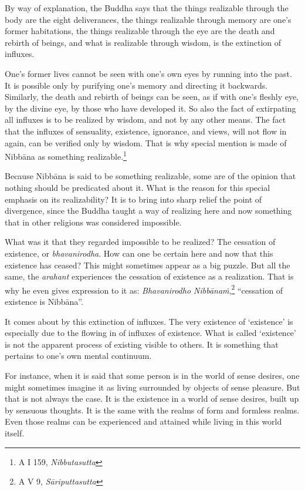 By way of explanation, the Buddha says that the things realizable through the body are the eight deliverances, the things realizable through memory are one's former habitations, the things realizable through the eye are the death and rebirth of beings, and what is realizable through wisdom, is the extinction of influxes.

One's former lives cannot be seen with one's own eyes by running into the past. It is possible only by purifying one's memory and directing it backwards. Similarly, the death and rebirth of beings can be seen, as if with one's fleshly eye, by the divine eye, by those who have developed it. So also the fact of extirpating all influxes is to be realized by wisdom, and not by any other means. The fact that the influxes of sensuality, existence, ignorance, and views, will not flow in again, can be verified only by wisdom. That is why special mention is made of Nibbāna as something realizable.\footnote{A I 159, \emph{Nibbutasutta}}

Because Nibbāna is said to be something realizable, some are of the opinion that nothing should be predicated about it. What is the reason for this special emphasis on its realizability? It is to bring into sharp relief the point of divergence, since the Buddha taught a way of realizing here and now something that in other religions was considered impossible.

What was it that they regarded impossible to be realized? The cessation of existence, or \emph{bhavanirodha}. How can one be certain here and now that this existence has ceased? This might sometimes appear as a big puzzle. But all the same, the \emph{arahant} experiences the cessation of existence as a realization. That is why he even gives expression to it as: \emph{Bhavanirodho Nibbānaṁ},\footnote{A V 9, \emph{Sāriputtasutta}} ``cessation of existence is Nibbāna''.

It comes about by this extinction of influxes. The very existence of `existence' is especially due to the flowing in of influxes of existence. What is called `existence' is not the apparent process of existing visible to others. It is something that pertains to one's own mental continuum.

For instance, when it is said that some person is in the world of sense desires, one might sometimes imagine it as living surrounded by objects of sense pleasure. But that is not always the case. It is the existence in a world of sense desires, built up by sensuous thoughts. It is the same with the realms of form and formless realms. Even those realms can be experienced and attained while living in this world itself.

